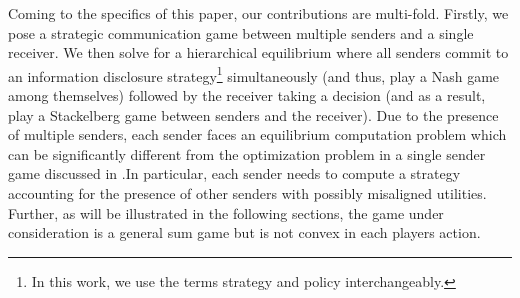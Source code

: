 \documentclass[12pt,journal,onecolumn]{IEEEtran}
\begin{document}
Coming to the specifics of this paper, our contributions are multi-fold. Firstly, we pose a strategic communication game between multiple senders and a single receiver. We then solve for a hierarchical equilibrium where all senders commit to an information disclosure strategy\footnote{In this work, we use the terms strategy and policy interchangeably.} simultaneously (and thus, play a Nash game among themselves) followed by the receiver taking a decision (and as a result, play a Stackelberg game between senders and the receiver)\cite{bacsar1998dynamic}. Due to the  presence of multiple senders, each sender faces an equilibrium computation problem which can be significantly different from the optimization problem in a single sender game discussed in \cite{tamura2018bayesian,sayin2019hierarchical}.In particular, each sender needs to compute a strategy accounting for the presence of other senders with possibly misaligned utilities. Further, as will be illustrated in the following sections, the game under consideration is a general sum game but is not convex in each players action. %
\end{document}
